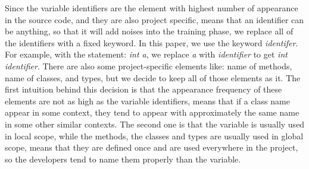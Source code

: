  Since the variable identifiers are the element with highest number of appearance in the source code, and they are also project specific, means that an identifier can be anything, so that it will add noises into the training phase, we replace all of the identifiers with a fixed keyword. In this paper, we use the keyword \textit{identifer}. For example, with the statement: \textit{int a}, we replace \textit{a} with \textit{identifier} to get \textit{int identifier}. There are also some project-specific elements like: name of methods, name of classes, and types, but we decide to keep all of those elements as it. The first intuition behind this decision is that the appearance frequency of these elements are not as high as the variable identifiers, means that if a class name appear in some context, they tend to appear with approximately the same name in some other similar contexts. The second one is that  the variable is usually used in local scope, while the methods, the classes and types are usually used in global scope, means that they are defined once and are used everywhere in the project, so the developers tend to name them properly than the variable.


